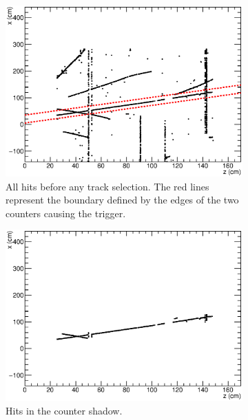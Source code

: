 \begin{figure}
  \centering
  \begin{subfigure}[t]{0.48\linewidth}
    \centering
    \includegraphics[width=\textwidth]{hitselection_all.eps}
    \caption{All hits before any track selection.  The red lines represent the boundary defined by the edges of the two counters causing the trigger.}
    \label{fig:TrackSelectionBefore}
  \end{subfigure}
  \hfill
  \begin{subfigure}[t]{0.48\linewidth}
    \centering
    \includegraphics[width=\textwidth]{hitselection_shadow.eps}
    \caption{Hits in the counter shadow.}
    \label{fig:TrackSelectionCounterShadow}
  \end{subfigure}
  \hfill
  \begin{subfigure}[t]{0.48\linewidth}

\end{subfigure}
\end{figure}
